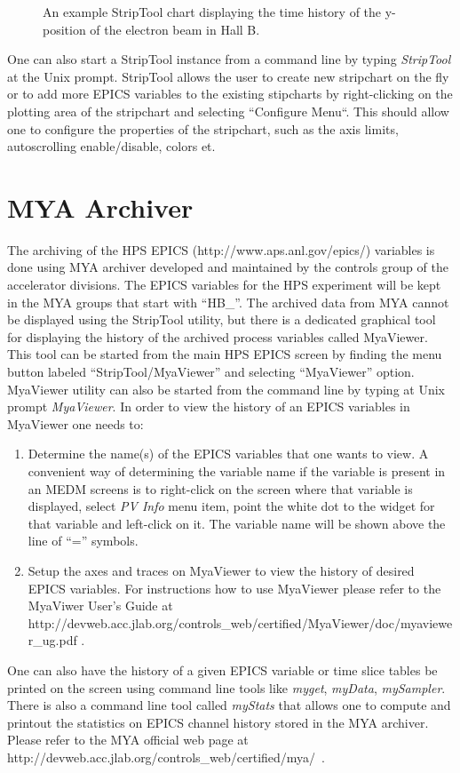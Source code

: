 \documentclass[letter,10pt]{article}
\begin{document}
 \begin{figure}
  \centering
  \caption{An example StripTool chart displaying the time history of the y-position of the electron beam in Hall B.} 
  \label{fig:strip_chart}
 \end{figure}

One can also start a StripTool instance from a command line by typing \textit{StripTool} at the Unix prompt. 
StripTool allows the user to create new stripchart on the fly or to add more EPICS 
variables to the existing stipcharts by right-clicking on the plotting area of the stripchart and selecting 
``Configure Menu``. This should allow one to configure the properties of the stripchart, such as the axis limits, 
autoscrolling enable/disable, colors et.


\section{MYA Archiver}
The archiving of the HPS EPICS (http://www.aps.anl.gov/epics/) variables is done using MYA archiver
developed and maintained by the controls group of the accelerator divisions. The EPICS variables for 
the HPS experiment will be kept in the MYA groups that start with ``HB\_''. The archived data from MYA 
cannot be displayed using the StripTool utility, but there is a dedicated graphical tool for 
displaying the history of the archived process variables called MyaViewer. This tool can be started 
from the main HPS EPICS screen by finding the menu button labeled ``StripTool/MyaViewer'' and selecting ``MyaViewer'' option. 
MyaViewer utility can also be started from the command line by typing at Unix prompt \textit{MyaViewer}.
In order to view the history of an EPICS variables in  MyaViewer one needs to:
\begin{enumerate}
 \item Determine the name(s) of the EPICS variables that one wants to view. A convenient way of determining the variable name 
       if the variable is present in an MEDM screens is to right-click on the screen where that variable is displayed, 
       select \textit{PV Info} menu item, point the white dot to the widget for that variable and left-click on it. 
       The variable name will be shown above the line of ``='' symbols. 
 \item Setup the axes and traces on MyaViewer to view the history of desired EPICS variables. For instructions 
       how to use MyaViewer please refer to the MyaViwer User's
       Guide at \newline http://devweb.acc.jlab.org/controls\_web/certified/MyaViewer/doc/myaviewer\_ug.pdf .
\end{enumerate}
One can also have the history of a given EPICS variable or time slice tables be printed on the screen using  
command line tools like \textit{myget}, \textit{myData}, \textit{mySampler}. There is also a command
line tool called \textit{myStats} that allows one to
compute and printout the statistics on EPICS channel history stored in the MYA archiver. Please refer to the 
MYA official web page at \newline http://devweb.acc.jlab.org/controls\_web/certified/mya/~. 
\end{document}
